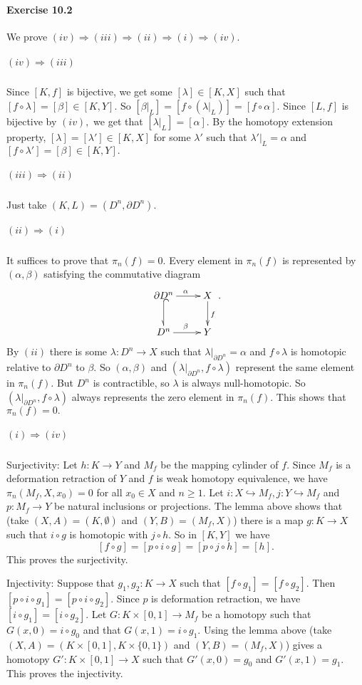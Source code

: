 \documentclass{article}
\begin{document}
\paragraph{Exercise 10.2}We prove $(iv)\Rightarrow(iii)\Rightarrow(ii)\Rightarrow(i)\Rightarrow(iv).$
\subparagraph{$(iv)\Rightarrow(iii)$}Since $[K,f]$ is bijective, we get some $[\lambda]\in[K,X]$ such that $[f\circ\lambda]=[\beta]\in[K,Y].$ So $[\beta|_L]=[f\circ(\lambda|_L)]=[f\circ\alpha].$ Since $[L,f]$ is bijective by $(iv),$ we get that $[\lambda|_L]=[\alpha].$ By the homotopy extension property, $[\lambda]=[\lambda']\in[K,X]$ for some $\lambda'$ such that $\lambda'|_L=\alpha$ and $[f\circ\lambda']=[\beta]\in[K,Y].$

\subparagraph{$(iii)\Rightarrow(ii)$}Just take $(K,L)=(D^n,\partial D^n).$

\subparagraph{$(ii)\Rightarrow(i)$}It suffices to prove that $\pi_n(f)=0.$ Every element in $\pi_n(f)$ is represented by $(\alpha,\beta)$ satisfying the commutative diagram
\[\xymatrix{
\partial D^n\ar[r]^{\alpha}\ar@{^(-_>}[d] & X\ar[d]^{f}\\
D^n\ar[r]^{\beta} & Y
}.\]
By $(ii)$ there is some $\lambda\colon D^n\rightarrow X$ such that $\lambda|_{\partial D^n}=\alpha$ and $f\circ\lambda$ is homotopic relative to $\partial D^n$ to $\beta.$ So $(\alpha,\beta)$ and $(\lambda|_{\partial D^{n}},f\circ\lambda)$ represent the same element in $\pi_n(f).$ But $D^n$ is contractible, so $\lambda$ is always null-homotopic. So $(\lambda|_{\partial D^{n}},f\circ\lambda)$ always represents the zero element in $\pi_n(f).$ This shows that $\pi_n(f)=0.$

\subparagraph{$(i)\Rightarrow(iv)$}Surjectivity: Let $h\colon K\rightarrow Y$ and $M_f$ be the mapping cylinder of $f.$ Since $M_f$ is a deformation retraction of $Y$ and $f$ is weak homotopy equivalence, we have $\pi_n(M_f,X,x_0)=0$ for all $x_0\in X$ and $n\geq1.$ Let $i\colon X\hookrightarrow M_f,j\colon Y\hookrightarrow M_f$ and $p\colon M_f\rightarrow Y$ be natural inclusions or projections. The lemma above shows that (take $(X,A)=(K,\emptyset)$ and $(Y,B)=(M_f,X)$) there is a map $g\colon K\rightarrow X$ such that $i\circ g$ is homotopic with $j\circ h.$ So in $[K,Y]$ we have
\[[f\circ g]=[p\circ i\circ g]=[p\circ j\circ h]=[h].\]
This proves the surjectivity.

Injectivity: Suppose that $g_1,g_2\colon K\rightarrow X$ such that $[f\circ g_1]=[f\circ g_2].$ Then $[p\circ i\circ g_1]=[p\circ i\circ g_2].$ Since $p$ is deformation retraction, we have $[i\circ g_1]=[i\circ g_2].$ Let $G\colon K\times[0,1]\rightarrow M_f$ be a homotopy such that $G(x,0)=i\circ g_0$ and that $G(x,1)=i\circ g_1.$ Using the lemma above (take $(X,A)=(K\times[0,1],K\times\{0,1\})$ and $(Y,B)=(M_f,X)$) gives a homotopy $G'\colon K\times[0,1]\rightarrow X$ such that $G'(x,0)=g_0$ and $G'(x,1)=g_1.$ This proves the injectivity.
\end{document}
